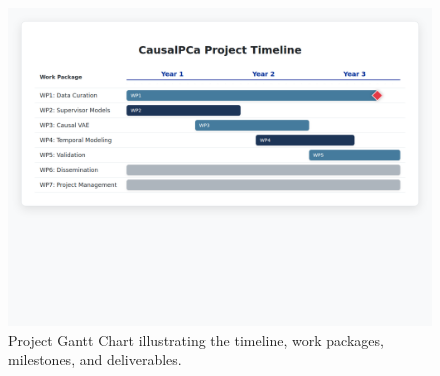 \documentclass[11pt, a4paper]{article}
\begin{document}
\begin{figure}[H]
    \centering
    \includegraphics[width=\textwidth]{gantt.png}
    \caption{Project Gantt Chart illustrating the timeline, work packages, milestones, and deliverables.}
    \label{fig:gantt}
\end{figure}
\end{document}
